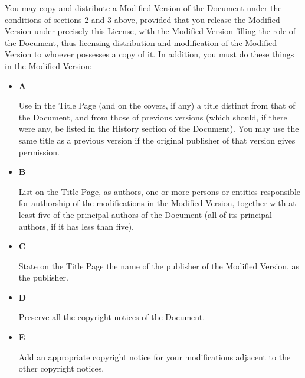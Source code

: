     
    


    

      You may copy and distribute a Modified Version of the Document under the conditions of
      sections 2 and 
      3 above, provided that you release
      the Modified Version under precisely this License, with the
      Modified Version filling the role of the Document, thus
      licensing distribution and modification of the Modified Version
      to whoever possesses a copy of it. In addition, you must do
      these things in the Modified Version:
    

    
    \begin{itemize}      \item \textbf{A}
	  

	    Use in the Title
	    Page (and on the covers, if any) a title distinct
	    from that of the Document, and from those of
	    previous versions (which should, if there were any, be
	    listed in the History section of the Document). You may
	    use the same title as a previous version if the original
	    publisher of that version gives permission.
	  

 
\item \textbf{B}
	  

	    List on the Title
	    Page, as authors, one or more persons or entities
	    responsible for authorship of the modifications in the
	    Modified Version,
	    together with at least five of the principal authors of
	    the Document (all of
	    its principal authors, if it has less than five).
	  

 
\item \textbf{C}
	  

	    State on the Title
	    Page the name of the publisher of the Modified Version, as the
	    publisher.
	  

 
\item \textbf{D}
	  

	    Preserve all the copyright notices of the Document.
	  

 
\item \textbf{E}
	  

	    Add an appropriate copyright notice for your modifications
	    adjacent to the other copyright notices.
	  


\end{itemize}
